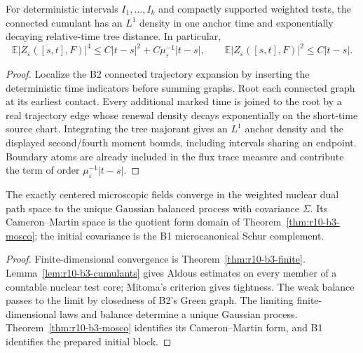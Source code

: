 \begin{lemma}
\label{lem:r10-b3-cumulants}
For deterministic intervals $I_1,\ldots,I_k$ and compactly supported weighted
tests, the connected cumulant has an $L^1$ density in one anchor time and
exponentially decaying relative-time tree distance.  In particular,
\[
 \mathbb E|Z_\varepsilon([s,t],F)|^4
 \le C|t-s|^2+C\mu_\varepsilon^{-1}|t-s|,
 \qquad
 \mathbb E|Z_\varepsilon([s,t],F)|^2\le C|t-s|.
\]
\end{lemma}

\begin{proof}
Localize the B2 connected trajectory expansion by inserting the deterministic
time indicators before summing graphs.  Root each connected graph at its
earliest contact.  Every additional marked time is joined to the root by a
real trajectory edge whose renewal density decays exponentially on the
short-time source chart.  Integrating the tree majorant gives an $L^1$ anchor
density and the displayed second/fourth moment bounds, including intervals
sharing an endpoint.  Boundary atoms are already included in the flux trace
measure and contribute the term of order $\mu_\varepsilon^{-1}|t-s|$.
\end{proof}

\begin{theorem}
\label{thm:r10-b3-main}
The exactly centered microscopic fields converge in the weighted nuclear dual
path space to the unique Gaussian balanced process with covariance $\Sigma$.
Its Cameron--Martin space is the quotient form domain of
Theorem~\ref{thm:r10-b3-mosco}; the initial covariance is the B1
microcanonical Schur complement.
\end{theorem}

\begin{proof}
Finite-dimensional convergence is Theorem~\ref{thm:r10-b3-finite}.
Lemma~\ref{lem:r10-b3-cumulants} gives Aldous estimates on every member of a
countable nuclear test core; Mitoma's criterion gives tightness.  The weak
balance passes to the limit by closedness of B2's Green graph.  The limiting
finite-dimensional laws and balance determine a unique Gaussian process.
Theorem~\ref{thm:r10-b3-mosco} identifies its Cameron--Martin form, and B1
identifies the prepared initial block.
\end{proof}
